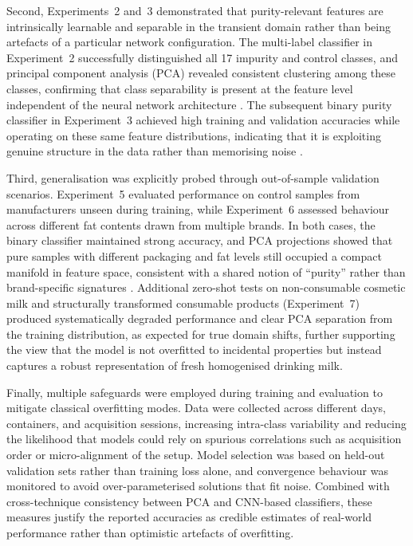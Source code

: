 \documentclass[12pt,a4paper,oneside]{report}
\begin{document}
Second, Experiments~2 and~3 demonstrated that purity-relevant features are intrinsically learnable and separable in the transient domain rather than being artefacts of a particular network configuration. The multi-label classifier in Experiment~2 successfully distinguished all 17 impurity and control classes, and principal component analysis (PCA) revealed consistent clustering among these classes, confirming that class separability is present at the feature level independent of the neural network architecture \cite{wold1987,bishop2006}. The subsequent binary purity classifier in Experiment~3 achieved high training and validation accuracies while operating on these same feature distributions, indicating that it is exploiting genuine structure in the data rather than memorising noise \cite{lecun1998,bishop2006}.

Third, generalisation was explicitly probed through out-of-sample validation scenarios. Experiment~5 evaluated performance on control samples from manufacturers unseen during training, while Experiment~6 assessed behaviour across different fat contents drawn from multiple brands. In both cases, the binary classifier maintained strong accuracy, and PCA projections showed that pure samples with different packaging and fat levels still occupied a compact manifold in feature space, consistent with a shared notion of ``purity'' rather than brand-specific signatures \cite{aernouts2015,nielsen2013}. Additional zero-shot tests on non-consumable cosmetic milk and structurally transformed consumable products (Experiment~7) produced systematically degraded performance and clear PCA separation from the training distribution, as expected for true domain shifts, further supporting the view that the model is not overfitted to incidental properties but instead captures a robust representation of fresh homogenised drinking milk.

Finally, multiple safeguards were employed during training and evaluation to mitigate classical overfitting modes. Data were collected across different days, containers, and acquisition sessions, increasing intra-class variability and reducing the likelihood that models could rely on spurious correlations such as acquisition order or micro-alignment of the setup. Model selection was based on held-out validation sets rather than training loss alone, and convergence behaviour was monitored to avoid over-parameterised solutions that fit noise. Combined with cross-technique consistency between PCA and CNN-based classifiers, these measures justify the reported accuracies as credible estimates of real-world performance rather than optimistic artefacts of overfitting.
\end{document}
